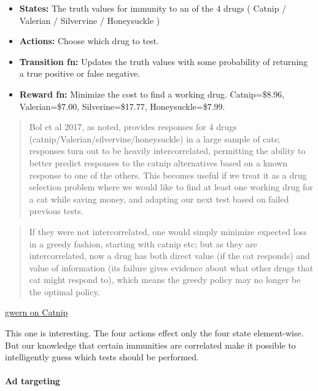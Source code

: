 \begin{itemize}
\tightlist
\item
  \textbf{States:} The truth values for immunity to an of the 4 drugs (
  Catnip / Valerian / Silvervine / Honeysuckle )
\item
  \textbf{Actions:} Choose which drug to test.
\item
  \textbf{Transition fn:} Updates the truth values with some probability
  of returning a true positive or false negative.
\item
  \textbf{Reward fn:} Minimize the cost to find a working drug.
  Catnip=\$8.96, Valerian=\$7.00, Silverine=\$17.77, Honeysuckle=\$7.99.
\end{itemize}

\begin{quote}
Bol et al 2017, as noted, provides responses for 4 drugs
(catnip/Valerian/silvervine/honeysuckle) in a large sample of cats;
responses turn out to be heavily intercorrelated, permitting the ability
to better predict responses to the catnip alternatives based on a known
response to one of the others. This becomes useful if we treat it as a
drug selection problem where we would like to find at least one working
drug for a cat while saving money, and adapting our next test based on
failed previous tests.
\end{quote}

\begin{quote}
If they were not intercorrelated, one would simply minimize expected
loss in a greedy fashion, starting with catnip etc; but as they are
intercorrelated, now a drug has both direct value (if the cat responds)
and value of information (its failure gives evidence about what other
drugs that cat might respond to), which means the greedy policy may no
longer be the optimal policy.
\end{quote}

\href{https://www.gwern.net/Catnip\#optimal-catnip-alternative-selection-solving-the-mdp}{gwern
on Catnip}

This one is interesting. The four actions effect only the four state
element-wise. But our knowledge that certain immunities are correlated
make it possible to intelligently guess which tests should be performed.

\hypertarget{ad-targeting}{%
\paragraph{Ad targeting}\label{ad-targeting}}

